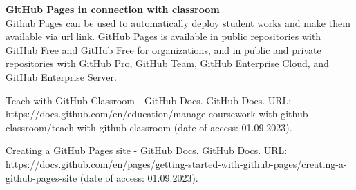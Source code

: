 \documentclass[a5paper, 10pt]{article}
\begin{document}
\textbf{GitHub Pages in connection with classroom} \\
Github Pages can be used to automatically deploy student works and make them available via url link. GitHub Pages is available in public repositories with GitHub Free and GitHub Free for organizations, and in public and private repositories with GitHub Pro, GitHub Team, GitHub Enterprise Cloud, and GitHub Enterprise Server. \cite{git_pages}

\vspace{1cm}



\vfill


\begin{thebibliography}{99}
 Teach with GitHub Classroom - GitHub Docs. GitHub Docs. URL: https://docs.github.com/en/education/manage-coursework-with-github-classroom/teach-with-github-classroom (date of access: 01.09.2023).

 Creating a GitHub Pages site - GitHub Docs. GitHub Docs. URL: https://docs.github.com/en/pages/getting-started-with-github-pages/creating-a-github-pages-site (date of access: 01.09.2023).
\end{thebibliography}
\end{document}
